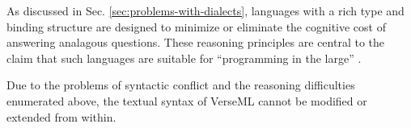 {As discussed in Sec. \ref{sec:problems-with-dialects}, languages with a rich type and binding structure are designed to minimize or eliminate the cognitive cost of answering analagous questions. These reasoning principles are central to the claim that such languages are suitable for ``programming in the large'' \cite{DeRemer76}. 

Due to the problems of syntactic conflict and the reasoning difficulties enumerated above, the textual syntax of VerseML cannot be modified or extended from within.%









}
